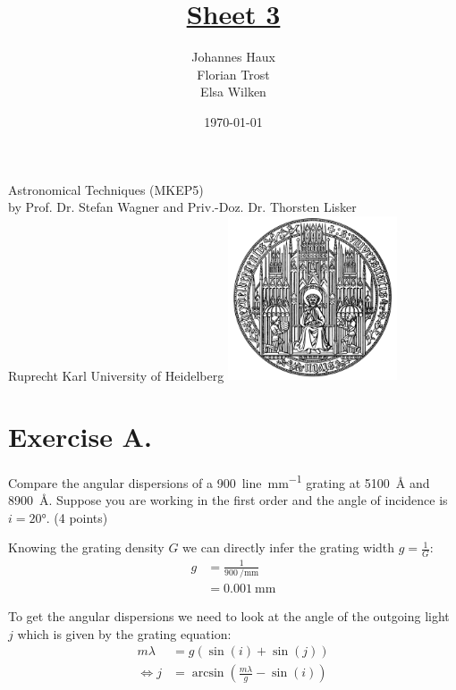 \documentclass[11pt,a4paper,twoside]{article}
\title{\LARGE \underline {Sheet 3}}
\author{Johannes Haux \\ Florian Trost \\ Elsa Wilken}
\date{\today}
\begin{document}
\maketitle
\thispagestyle{empty}

\begin{center}
  Astronomical Techniques (MKEP5) \\
  \baselineskip35pt
  by Prof. Dr. Stefan Wagner and Priv.-Doz. Dr. Thorsten Lisker \\
  \baselineskip60pt
  Ruprecht Karl University of Heidelberg
\vskip 40pt
\includegraphics[width=5cm]{pic/UniHD.png}

\end{center}

\newpage
\setcounter{page}{1}		%

\section*{Exercise A.}

Compare the angular dispersions of a \SI{900}{line\per\milli\meter} grating at 
\SI{5100}{\angstrom} and \SI{8900}{\angstrom}. Suppose you are working in the 
first order and the angle of incidence is $i = \ang{20}$. (4 points)
\newline

Knowing the grating density $G$ we can directly infer the grating width $g = 
\frac{1}{G}$:
\begin{align}
    g   &= \frac{1}{\SI{900}{\per\milli\meter}} \\
        &= \SI{0.001}{\milli\meter}
\end{align}

To get the angular dispersions we need to look at the angle of the outgoing
light $j$ which is given by the grating equation:
\begin{align}
    m\lambda &= g\left( \sin(i) + \sin(j) \right)  \\
    \Leftrightarrow j &= \arcsin\left( \frac{m\lambda}{g} - \sin(i)\right)
\end{align}
\end{document}
